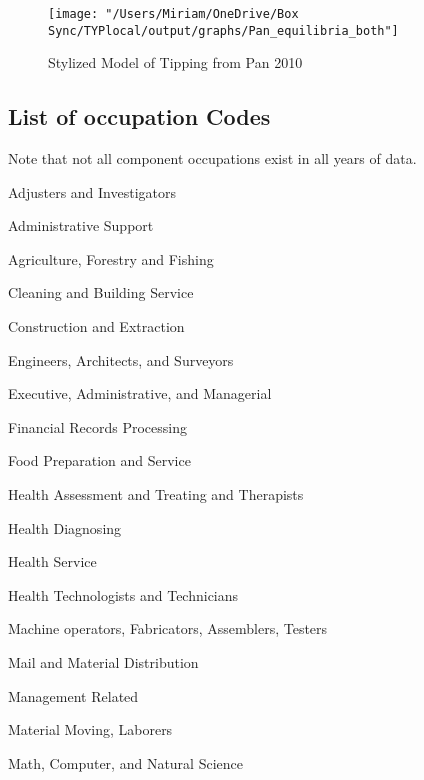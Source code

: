 \documentclass[12pt]{article}
\begin{document}
\begin{figure}[H]
\centering
\caption{Stylized Model of Tipping from Pan 2010}
\label{fig:tipping}
\texttt{[image: "/Users/Miriam/OneDrive/Box Sync/TYPlocal/output/graphs/Pan\_equilibria\_both"]}
\end{figure}


\subsection{List of occupation Codes} \label{occupations}

Note that not all component occupations exist in all years of data. 

%

   
   Adjusters and Investigators
   
   Administrative Support
   
   Agriculture, Forestry and Fishing
   
   Cleaning and Building Service 
   
   Construction and Extraction
   
   Engineers, Architects, and Surveyors
   
   Executive, Administrative, and Managerial
   
   Financial Records Processing 
   
   Food Preparation and Service 
   
   Health Assessment and Treating and Therapists
   
   Health Diagnosing
   
   Health Service
   
   Health Technologists and Technicians
   
   Machine operators, Fabricators, Assemblers, Testers
   
   Mail and Material Distribution
   
   Management Related
   
   Material Moving, Laborers
   
   Math, Computer, and Natural Science
   
\end{document}
